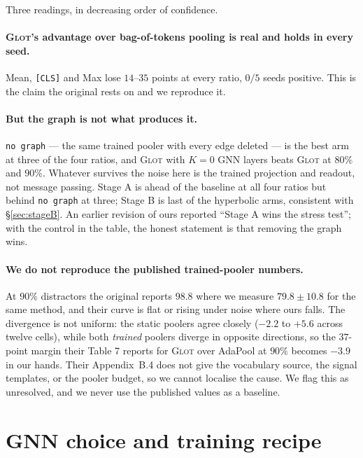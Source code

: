 \documentclass{article}
\begin{document}
Three readings, in decreasing order of confidence.

\paragraph{\textsc{Glot}'s advantage over bag-of-tokens pooling is real and
holds in every seed.} Mean, \texttt{[CLS]} and Max lose $14$--$35$ points at
every ratio, $0/5$ seeds positive. This is the claim the original rests on and
we reproduce it.

\paragraph{But the graph is not what produces it.} \texttt{no graph} --- the
same trained pooler with every edge deleted --- is the best arm at three of the
four ratios, and \textsc{Glot} with $K{=}0$ GNN layers beats \textsc{Glot} at
$80\%$ and $90\%$. Whatever survives the noise here is the trained projection
and readout, not message passing. Stage A is ahead of the baseline at all four
ratios but behind \texttt{no graph} at three; Stage B is last of the hyperbolic
arms, consistent with \S\ref{sec:stageB}. An earlier revision of ours reported
``Stage A wins the stress test''; with the control in the table, the honest
statement is that removing the graph wins.

\paragraph{We do not reproduce the published trained-pooler numbers.} At $90\%$
distractors the original reports $98.8$ where we measure $79.8 \pm 10.8$ for the
same method, and their curve is flat or rising under noise where ours falls. The
divergence is not uniform: the static poolers agree closely ($-2.2$ to $+5.6$
across twelve cells), while both \emph{trained} poolers diverge in opposite
directions, so the $37$-point margin their Table 7 reports for \textsc{Glot}
over AdaPool at $90\%$ becomes $-3.9$ in our hands. Their Appendix~B.4 does not
give the vocabulary source, the signal templates, or the pooler budget, so we
cannot localise the cause. We flag this as unresolved, and we never use the
published values as a baseline.

\section{GNN choice and training recipe}
\label{app:factorial}
\end{document}
